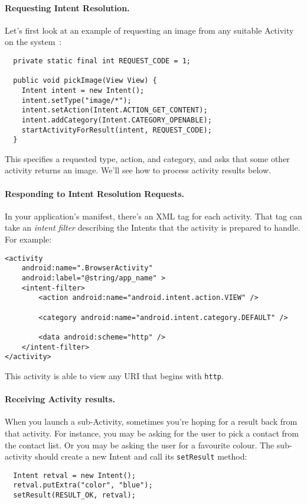 \paragraph{Requesting Intent Resolution.} Let's first look at an example of requesting an image from any 
suitable Activity on the
system~\cite{vogella}:
{\small 
\begin{lstlisting}
  private static final int REQUEST_CODE = 1;

  public void pickImage(View View) {
    Intent intent = new Intent();
    intent.setType("image/*");
    intent.setAction(Intent.ACTION_GET_CONTENT);
    intent.addCategory(Intent.CATEGORY_OPENABLE);
    startActivityForResult(intent, REQUEST_CODE);
  }
\end{lstlisting}
}
This specifies a requested type, action, and category, and asks that
some other activity returns an image. We'll see how to process
activity results below.

\paragraph{Responding to Intent Resolution Requests.}
In your application's manifest, there's an XML tag for each activity.
That tag can take an \emph{intent filter} describing the Intents
that the activity is prepared to handle. For example:
{\small 
\begin{lstlisting}
<activity
    android:name=".BrowserActivity"
    android:label="@string/app_name" >
    <intent-filter>
        <action android:name="android.intent.action.VIEW" />

        <category android:name="android.intent.category.DEFAULT" />

        <data android:scheme="http" />
    </intent-filter>
</activity>
\end{lstlisting}
}
This activity is able to view any URI that begins with {\tt http}.

\paragraph{Receiving Activity results.}
When you launch a sub-Activity, sometimes you're hoping for a result
back from that activity. For instance, you may be asking for the
user to pick a contact from the contact list. Or you may be asking the
user for a favourite colour. The sub-activity should
create a new Intent and call its {\tt setResult} method:

{\scriptsize 
\begin{lstlisting}
  Intent retval = new Intent();
  retval.putExtra("color", "blue");
  setResult(RESULT_OK, retval);
\end{lstlisting}
}

